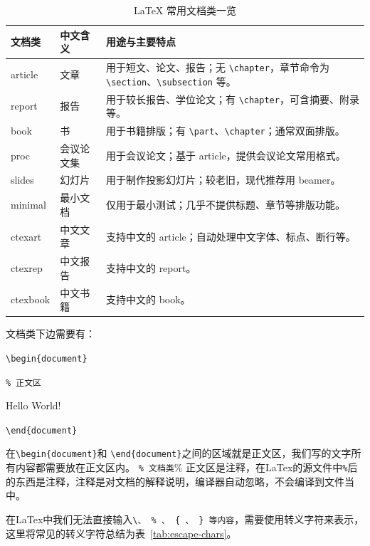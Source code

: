 \documentclass[12pt,a4paper]{ctexart}
\begin{document}
\begin{table}[htbp]
  \centering
  \caption{LaTeX 常用文档类一览}
  \label{tab:classname}
  \begin{tabularx}{\textwidth}{@{}l l X@{}}
    \toprule
    文档类 & 中文含义 & 用途与主要特点 \\
    \midrule
    article & 文章 & 用于短文、论文、报告；无 \texttt{\textbackslash chapter}，章节命令为 \texttt{\textbackslash section}、\texttt{\textbackslash subsection} 等。 \\
    report & 报告 & 用于较长报告、学位论文；有 \texttt{\textbackslash chapter}，可含摘要、附录等。 \\
    book & 书 & 用于书籍排版；有 \texttt{\textbackslash part}、\texttt{\textbackslash chapter}；通常双面排版。 \\
    proc & 会议论文集 & 用于会议论文；基于 article，提供会议论文常用格式。 \\
    slides & 幻灯片 & 用于制作投影幻灯片；较老旧，现代推荐用 beamer。 \\
    minimal & 最小文档 & 仅用于最小测试；几乎不提供标题、章节等排版功能。 \\
    ctexart & 中文文章 & 支持中文的 article；自动处理中文字体、标点、断行等。 \\
    ctexrep & 中文报告 & 支持中文的 report。 \\
    ctexbook & 中文书籍 & 支持中文的 book。 \\
    \bottomrule
  \end{tabularx}
\end{table}

文档类下边需要有：

 \texttt{\textbackslash begin\{document\}}

 \texttt{\% 正文区}

  Hello World!

 \texttt{\textbackslash end\{document\}}

  在\texttt{\textbackslash begin\{document\}}和 \texttt{\textbackslash end\{document\}}之间的区域就是正文区，我们写的文字所有内容都需要放在正文区内。
  \texttt{\% 文档类}{\% 正文区}是注释，在LaTex的源文件中\texttt{\%}后的东西是注释，注释是对文档的解释说明，编译器自动忽略，不会编译到文件当中。

  在LaTex中我们无法直接输入\texttt{\textbackslash 、 \% 、 \{ 、 \} 等内容}，需要使用转义字符来表示，这里将常见的转义字符总结为表~\ref{tab:escape-chars}。
\end{document}
